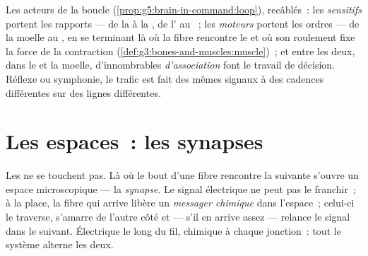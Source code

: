 \begin{example}\label{ex:g8:nervous-communication:lines}
Les acteurs de la boucle (\cref{prop:g5:brain-in-command:loop}),
recâblés~: les \emph{ sensitifs} portent les rapports ---
de la  à la , de l' au ~; les
\emph{ moteurs} portent les ordres --- de la moelle au
, en se terminant là où la fibre rencontre le  et où son
roulement fixe la force de la contraction
(\cref{def:g3:bones-and-muscles:muscle})~; et entre les deux, dans
le  et la moelle, d'innombrables \emph{
d'association} font le travail de décision. Réflexe ou symphonie, le
trafic est fait des mêmes signaux à des cadences différentes sur des
lignes différentes.
\end{example}

\section{Les espaces~: les synapses}

\begin{definition}[La synapse]\label{def:g8:nervous-communication:synapse}
Les  ne se touchent pas. Là où le bout d'une fibre rencontre
la  suivante s'ouvre un espace microscopique --- la
\emph{synapse}. Le signal électrique ne peut pas le
franchir~; à la place, la fibre qui arrive libère un
\emph{messager chimique} dans l'espace~; celui-ci le traverse,
s'amarre de l'autre côté et --- s'il en arrive assez --- relance le
signal dans le  suivant. Électrique le long du fil, chimique
à chaque jonction~: tout le système alterne les deux.
\end{definition}

